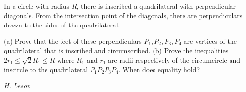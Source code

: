 In a circle with radius $R$, there is inscribed a quadrilateral with perpendicular diagonals. From the intersection point of the diagonals, there are perpendiculars drawn to the sides of the quadrilateral.

(a) Prove that the feet of these perpendiculars $P_1,P_2,P_3,P_4$ are vertices of the quadrilateral that is inscribed and circumscribed.
(b) Prove the inequalities $2r_1\le\sqrt2 R_1\le R$ where $R_1$ and $r_1$ are radii respectively of the circumcircle and inscircle to the quadrilateral $P_1P_2P_3P_4$. When does equality hold?

\textit{H. Lesov}